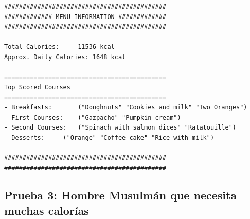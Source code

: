 \documentclass[11]{article}
\begin{document}
\begin{lstlisting}[frame=single]
############################################
############# MENU INFORMATION #############
############################################

Total Calories:		11536 kcal
Approx. Daily Calories:	1648 kcal

============================================
Top Scored Courses
============================================
- Breakfasts:		("Doughnuts" "Cookies and milk" "Two Oranges")
- First Courses:	("Gazpacho" "Pumpkin cream")
- Second Courses:	("Spinach with salmon dices" "Ratatouille")
- Desserts:		("Orange" "Coffee cake" "Rice with milk")

############################################
############################################
\end{lstlisting}
\subsection{Prueba 3: Hombre Musulmán que necesita muchas calorías}
\end{document}
